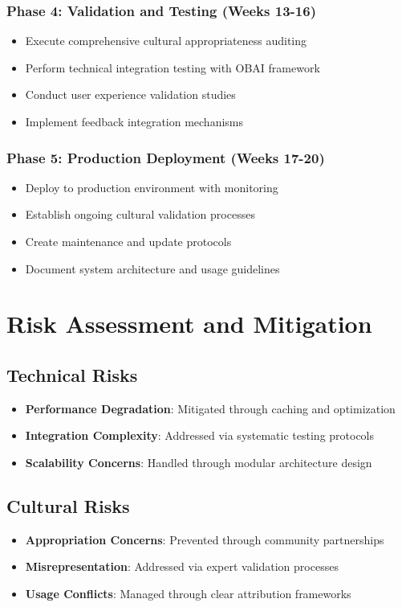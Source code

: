 \documentclass[12pt]{article}
\begin{document}
\subsubsection{Phase 4: Validation and Testing (Weeks 13-16)}
\begin{itemize}
    \item Execute comprehensive cultural appropriateness auditing
    \item Perform technical integration testing with OBAI framework
    \item Conduct user experience validation studies
    \item Implement feedback integration mechanisms
\end{itemize}

\subsubsection{Phase 5: Production Deployment (Weeks 17-20)}
\begin{itemize}
    \item Deploy to production environment with monitoring
    \item Establish ongoing cultural validation processes
    \item Create maintenance and update protocols
    \item Document system architecture and usage guidelines
\end{itemize}

\section{Risk Assessment and Mitigation}

\subsection{Technical Risks}
\begin{itemize}
    \item \textbf{Performance Degradation}: Mitigated through caching and optimization
    \item \textbf{Integration Complexity}: Addressed via systematic testing protocols
    \item \textbf{Scalability Concerns}: Handled through modular architecture design
\end{itemize}

\subsection{Cultural Risks}
\begin{itemize}
    \item \textbf{Appropriation Concerns}: Prevented through community partnerships
    \item \textbf{Misrepresentation}: Addressed via expert validation processes
    \item \textbf{Usage Conflicts}: Managed through clear attribution frameworks
\end{itemize}
\end{document}
